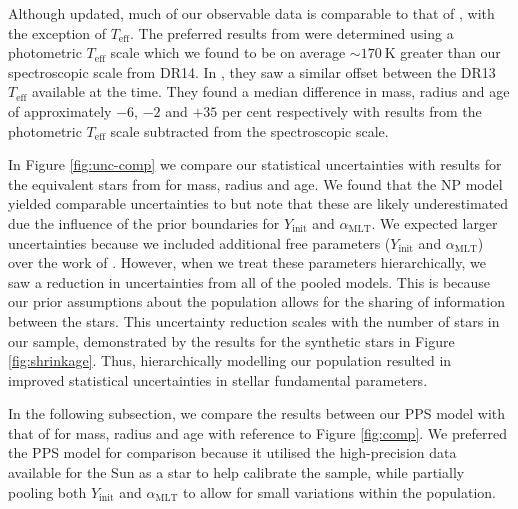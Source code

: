 \documentclass[a4paper,fleqn,usenatbib]{mnras}
\newcommand{\teff}{\ensuremath{T_\mathrm{eff}}}
\newcommand{\mlt}{\ensuremath{{\alpha_\mathrm{MLT}}}}
\begin{document}
Although updated, much of our observable data is comparable to that of , with the exception of $\teff$. The preferred results from  were determined using a photometric $\teff$ scale which we found to be on average $\sim \SI{170}{\kelvin}$ greater than our spectroscopic scale from DR14. In , they saw a similar offset between the DR13 $\teff$ available at the time. They found a median difference in mass, radius and age of approximately $-6$, $-2$ and $+35$ per cent respectively with results from the photometric $\teff$ scale subtracted from the spectroscopic scale.

In Figure \ref{fig:unc-comp} we compare our statistical uncertainties with results for the equivalent stars from  for mass, radius and age. We found that the NP model yielded comparable uncertainties to  but note that these are likely underestimated due the influence of the prior boundaries for $Y_\mathrm{init}$ and $\mlt$. We expected larger uncertainties because we included additional free parameters ($Y_\mathrm{init}$ and $\mlt$) over the work of . However, when we treat these parameters hierarchically, we saw a reduction in uncertainties from all of the pooled models. This is because our prior assumptions about the population allows for the sharing of information between the stars. This uncertainty reduction scales with the number of stars in our sample, demonstrated by the results for the synthetic stars in Figure \ref{fig:shrinkage}. Thus, hierarchically modelling our population resulted in improved statistical uncertainties in stellar fundamental parameters.

In the following subsection, we compare the results between our PPS model with that of  for mass, radius and age with reference to Figure \ref{fig:comp}. We preferred the PPS model for comparison because it utilised the high-precision data available for the Sun as a star to help calibrate the sample, while partially pooling both $Y_\mathrm{init}$ and $\mlt$ to allow for small variations within the population.
\end{document}
